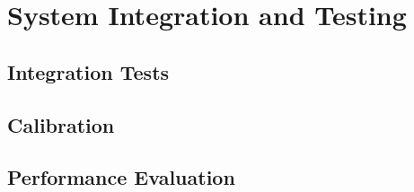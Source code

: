\chapter{System Integration and Testing}
\label{chap:testing}

\setcounter{section}{0}
\setcounter{subsection}{0}

\section{Integration Tests}


\section{Calibration}


\section{Performance Evaluation}



